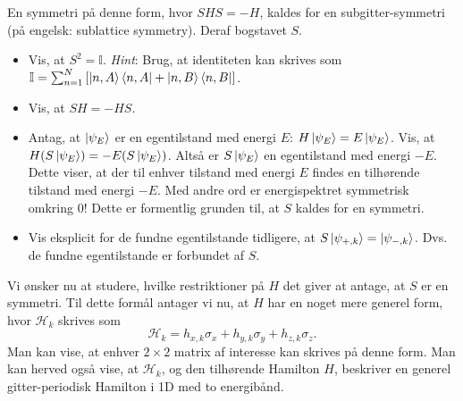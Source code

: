 \documentclass[11pt, a4paper]{article}
\begin{document}
En symmetri på denne form, hvor $SHS = -H$, kaldes for en subgitter-symmetri (på engelsk: sublattice symmetry). Deraf bogstavet $S$. 

\begin{itemize}
	\item Vis, at $S^2 = \mathbb{I}$. \textit{Hint}: Brug, at identiteten kan skrives som $\mathbb{I} = \sum_{n = 1}^N \left[\ket{n, A}\bra{n, A} + \ket{n, B}\bra{n, B}\right]$.  

	\item Vis, at $SH = -HS$. 

	\item Antag, at $\ket{\psi_E}$ er en egentilstand med energi $E$: $H \ket{\psi_E} = E \ket{\psi_E}$. Vis, at $H(S\ket{\psi_E}) = -E(S\ket{\psi_E})$. Altså er $S\ket{\psi_E}$ en egentilstand med energi $-E$. Dette viser, at der til enhver tilstand med energi $E$ findes en tilhørende tilstand med energi $-E$. Med andre ord er energispektret symmetrisk omkring 0! Dette er formentlig grunden til, at $S$ kaldes for en symmetri. 

	\item Vis eksplicit for de fundne egentilstande tidligere, at $S\ket{\psi_{+, k}} = \ket{\psi_{-, k}}$. Dvs. de fundne egentilstande er forbundet af $S$.  
\end{itemize}

Vi ønsker nu at studere, hvilke restriktioner på $H$ det giver at antage, at $S$ er en symmetri. Til dette formål antager vi nu, at $H$ har en noget mere generel form, hvor $\mathcal{H}_k$ skrives som
\begin{equation}
\mathcal{H}_k = h_{x, k}\sigma_x + h_{y, k}\sigma_y + h_{z, k}\sigma_z. 
\label{eq.general_Hamilton}
\end{equation}
Man kan vise, at enhver $2\times 2$ matrix af interesse kan skrives på denne form. Man kan herved også vise, at $\mathcal{H}_k$, og den tilhørende Hamilton $H$, beskriver en generel gitter-periodisk Hamilton i 1D med to energibånd. 
\end{document}

